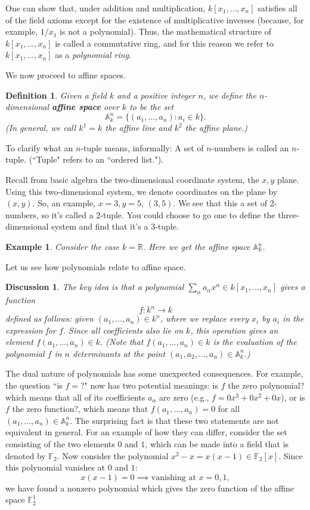 \documentclass[12pt,reqno]{amsart}
\theoremstyle{plain}
\newtheorem{defi}{Definition}
\newtheorem{disc}{Discussion}
\newtheorem{ex}{Example}
\newcommand{\aff}{\mathbb A}
\newcommand{\ff}{\mathbb F}
\newcommand{\pring}{k[x_1, \ldots , x_n]}
\newcommand{\poly}{\sum_{\alpha} a_{\alpha} x^{\alpha}}
\newcommand{\rr}{\mathbb R}
\begin{document}
One can show that, under addition and multiplication, $k \left[x_1, \ldots , x_n\right]$ satisfies all of the field axioms except for the existence of multiplicative inverses (because, for example, $1/x_1$ is not a polynomial). Thus, the mathematical structure of $k \left[x_1, \ldots , x_n\right]$ is called a commutative ring, and for this reason we refer to $k \left[x_1, \ldots , x_n\right]$ as a \textit{polynomial ring}. 

We now proceed to affine spaces. 
\begin{defi} Given a field $k$ and a positive integer $n$, we define the $n$-dimensional \textup{\textbf{affine space}} over $k$ to be the set $$\mathbb{A}_k^n = \{ (a_1, \ldots, a_n ) \colon a_i \in k \}.$$  (In general, we call $k^1 = k$ the \textit{affine line} and $k^2$ the \textit{affine plane}.) 
\end{defi}


To clarify what an $n$-tuple means, informally: A set of $n$-numbers is called an $n$-tuple. (``Tuple" refers to an ``ordered list."). 

Recall from basic algebra the two-dimensional coordinate system, the $x,y$ plane. Using this two-dimensional system, we denote coordinates on the plane by $(x,y)$. So, an example, $x=3, y =5$, $(3,5)$. We see that this a set of 2-numbers, so it's called a 2-tuple. You could choose to go one to define the three-dimensional system and find that it's a 3-tuple. 
\begin{ex} Consider the case $k = \rr$. Here we get the affine space $\aff_{\rr}^n$.
\end{ex} 

Let us see how polynomials relate to affine space. 
\begin{disc} The key idea is that a polynomial $\poly \in \pring$ gives a function $$f \colon k^n \to k$$ defined as follows: given $(a_1, \ldots , a_n) \in k^n$, where we replace every $x_i$ by $a_i$ in the expression for $f$. Since all coefficients also lie on $k$, this operation gives an element $f (a_1, \ldots, a_n) \in k$. (Note that $f(a_1, \ldots, a_n) \in k$ is the evaluation of the polynomial $f$ in $n$ determinants at the point $(a_1, a_2, \ldots , a_n) \in \aff_{k}^n$.)
\end{disc}

The dual nature of polynomials has some unexpected consequences. For example, the question ``is $f =$?" now has two potential meanings: is $f$ the zero polynomial? which means that all of its coefficients $a_{\alpha}$ are zero (e.g., $f = 0x^3 + 0x^2 +0x$), or is $f$ the zero function?, which means that $f(a_1, \ldots , a_n) = 0$ for all $(a_1, \ldots, a_n) \in \aff_k^n$. The surprising fact is that these two statements are not equivalent in general. For an example of how they can differ, consider the set consisting of the two elements $0$ and $1$, which can be made into a field that is denoted by $\ff_2$. Now consider the polynomial $x^2 - x = x(x-1) \in \ff_2[x]$. Since this polynomial vanishes at $0$ and $1$: $$x(x-1) = 0 \implies \text{vanishing at }x =0, 1 ,$$ we have found a nonzero polynomial which gives the zero function of the affine space $\ff_2^1$
\end{document}
